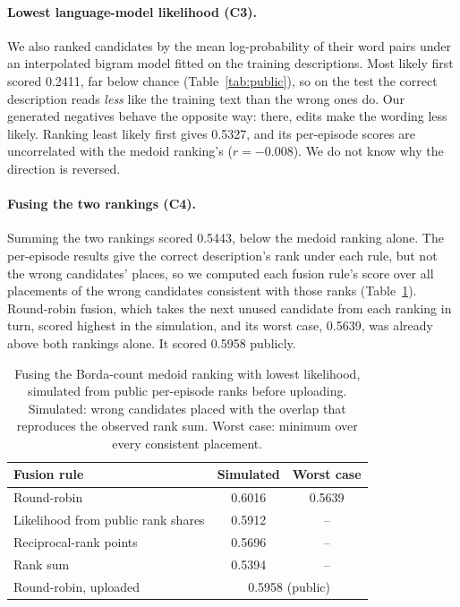 \documentclass[10pt,twocolumn]{article}
\newcommand{\cha}[1]{\textsf{C#1}}
\begin{document}
\paragraph{Lowest language-model likelihood (\cha3).} We also ranked candidates by the mean log-probability of
their word pairs under an interpolated bigram model fitted on the training descriptions. Most likely first scored
0.2411, far below chance (Table~\ref{tab:public}), so on the test the correct description reads \emph{less} like
the training text than the wrong ones do. Our generated negatives behave the opposite way: there, edits make the
wording less likely. Ranking least likely first gives 0.5327, and its per-episode scores are uncorrelated with the
medoid ranking's ($r=-0.008$). We do not know why the direction is reversed.

\paragraph{Fusing the two rankings (\cha4).} Summing the two rankings scored 0.5443, below the medoid ranking alone.
The per-episode results give the correct description's rank under each rule, but not the wrong candidates' places,
so we computed each fusion rule's score over all placements of the wrong candidates consistent with those ranks
(Table~\ref{tab:fusion}). Round-robin fusion, which takes the next unused candidate from each ranking in turn, scored
highest in the simulation, and its worst case, 0.5639, was already above both rankings alone. It scored 0.5958
publicly.

\begin{table}[t]
\caption{Fusing the Borda-count medoid ranking with lowest likelihood, simulated from public per-episode ranks
before uploading. Simulated: wrong candidates placed with the overlap that reproduces the observed rank sum.
Worst case: minimum over every consistent placement.}
\label{tab:fusion}
\footnotesize
\begin{tabularx}{\columnwidth}{>{\raggedright\arraybackslash}Xcc}
\toprule
Fusion rule & Simulated & Worst case \\
\midrule
Round-robin & 0.6016 & 0.5639 \\
Likelihood from public rank shares & 0.5912 & -- \\
Reciprocal-rank points & 0.5696 & -- \\
Rank sum & 0.5394 & -- \\
\midrule
Round-robin, uploaded & \multicolumn{2}{c}{0.5958 (public)} \\
\bottomrule
\end{tabularx}
\end{table}
\end{document}
